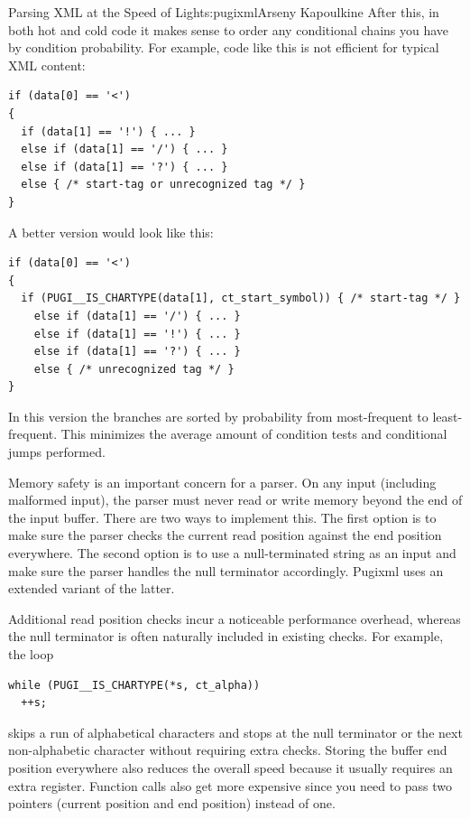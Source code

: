 \begin{aosachapter}{Parsing XML at the Speed of Light}{s:pugixml}{Arseny Kapoulkine}
After this, in both hot and cold code it makes sense to order any
conditional chains you have by condition probability. For example, code
like this is not efficient for typical XML content:

\begin{verbatim}
if (data[0] == '<')
{
  if (data[1] == '!') { ... }
  else if (data[1] == '/') { ... }
  else if (data[1] == '?') { ... }
  else { /* start-tag or unrecognized tag */ }
}
\end{verbatim}

\noindent A better version would look like this:

\begin{verbatim}
if (data[0] == '<')
{
  if (PUGI__IS_CHARTYPE(data[1], ct_start_symbol)) { /* start-tag */ }
    else if (data[1] == '/') { ... }
    else if (data[1] == '!') { ... }
    else if (data[1] == '?') { ... }
    else { /* unrecognized tag */ }
}
\end{verbatim}

\noindent In this version the branches are sorted by probability from
most-frequent to least-frequent. This minimizes the average amount of
condition tests and conditional jumps performed.


Memory safety is an important concern for a parser. On any input
(including malformed input), the parser must never read or write memory
beyond the end of the input buffer. There are two ways to implement
this. The first option is to make sure the parser checks the current
read position against the end position everywhere. The second option is
to use a null-terminated string as an input and make sure the parser
handles the null terminator accordingly. Pugixml uses an extended
variant of the latter.

Additional read position checks incur a noticeable performance overhead,
whereas the null terminator is often naturally included in existing
checks. For example, the loop

\begin{verbatim}
while (PUGI__IS_CHARTYPE(*s, ct_alpha))
  ++s;
\end{verbatim}

\noindent skips a run of alphabetical characters and stops at the null
terminator or the next non-alphabetic character without requiring extra
checks. Storing the buffer end position everywhere also reduces the
overall speed because it usually requires an extra register. Function
calls also get more expensive since you need to pass two pointers
(current position and end position) instead of one.


\end{aosachapter}
